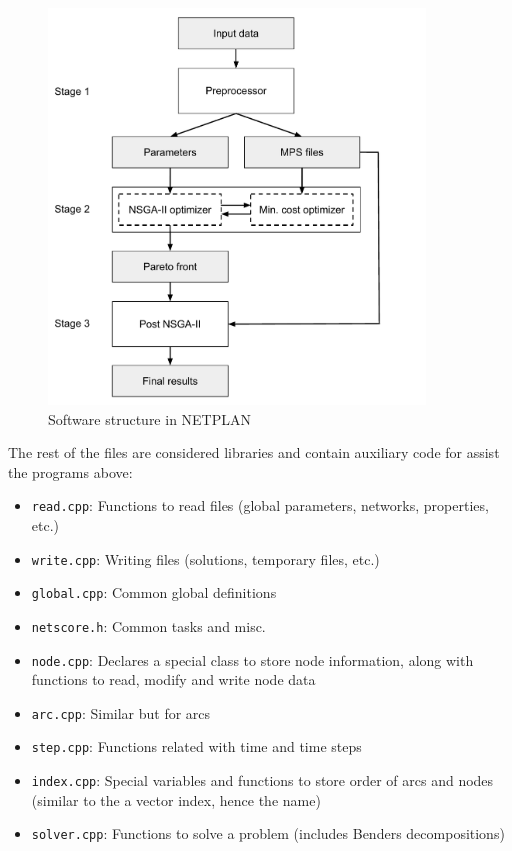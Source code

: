 \documentclass{article}
\begin{document}
\begin{figure}[htp] \centering
  \includegraphics[width=100mm]{figs/software_structure}
  \caption{Software structure in NETPLAN}
  \label{fig:software_implement}
\end{figure}


The rest of the files are considered libraries and contain auxiliary code for assist the programs above:

\begin{itemize}
  \item \verb=read.cpp=: Functions to read files (global parameters, networks, properties, etc.)
  \item \verb=write.cpp=: Writing files (solutions, temporary files, etc.)
  \item \verb=global.cpp=: Common global definitions
  \item \verb=netscore.h=: Common tasks and misc.
  \item \verb=node.cpp=: Declares a special class to store node information, along with functions to read, modify and write node data
  \item \verb=arc.cpp=: Similar but for arcs
  \item \verb=step.cpp=: Functions related with time and time steps
  \item \verb=index.cpp=: Special variables and functions to store order of arcs and nodes (similar to the a vector index, hence the name)
  \item \verb=solver.cpp=: Functions to solve a problem (includes Benders decompositions)
\end{itemize}
\end{document}

